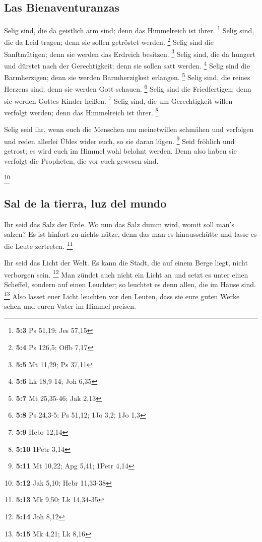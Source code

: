 \hypertarget{las-bienaventuranzas}{%
\subsection{Las Bienaventuranzas}\label{las-bienaventuranzas}}

 Selig sind, die da geistlich arm sind; denn das
Himmelreich ist ihrer. \footnote{\textbf{5:3} Ps 51,19; Jes 57,15}
 Selig sind, die da Leid tragen; denn sie sollen getröstet
werden. \footnote{\textbf{5:4} Ps 126,5; Offb 7,17}  Selig
sind die Sanftmütigen; denn sie werden das Erdreich besitzen.
\footnote{\textbf{5:5} Mt 11,29; Ps 37,11}  Selig sind,
die da hungert und dürstet nach der Gerechtigkeit; denn sie sollen satt
werden. \footnote{\textbf{5:6} Lk 18,9-14; Joh 6,35} 
Selig sind die Barmherzigen; denn sie werden Barmherzigkeit erlangen.
\footnote{\textbf{5:7} Mt 25,35-46; Jak 2,13}  Selig sind,
die reines Herzens sind; denn sie werden Gott schauen. \footnote{\textbf{5:8}
  Ps 24,3-5; Ps 51,12; 1Jo 3,2; 1Jo 1,3}  Selig sind die
Friedfertigen; denn sie werden Gottes Kinder heißen. \footnote{\textbf{5:9}
  Hebr 12,14}  Selig sind, die um Gerechtigkeit willen
verfolgt werden; denn das Himmelreich ist ihrer. \footnote{\textbf{5:10}
  1Petr 3,14}

 Selig seid ihr, wenn euch die Menschen um meinetwillen
schmähen und verfolgen und reden allerlei Übles wider euch, so sie daran
lügen. \footnote{\textbf{5:11} Mt 10,22; Apg 5,41; 1Petr 4,14}
 Seid fröhlich und getrost; es wird euch im Himmel wohl
belohnt werden. Denn also haben sie verfolgt die Propheten, die vor euch
gewesen sind.

\footnote{\textbf{5:12} Jak 5,10; Hebr 11,33-38}

\hypertarget{sal-de-la-tierra-luz-del-mundo}{%
\subsection{Sal de la tierra, luz del
mundo}\label{sal-de-la-tierra-luz-del-mundo}}

 Ihr seid das Salz der Erde. Wo nun das Salz dumm wird,
womit soll man's salzen? Es ist hinfort zu nichts nütze, denn das man es
hinausschütte und lasse es die Leute zertreten. \footnote{\textbf{5:13}
  Mk 9,50; Lk 14,34-35}

 Ihr seid das Licht der Welt. Es kann die Stadt, die auf
einem Berge liegt, nicht verborgen sein. \footnote{\textbf{5:14} Joh
  8,12}  Man zündet auch nicht ein Licht an und setzt es
unter einen Scheffel, sondern auf einen Leuchter; so leuchtet es denn
allen, die im Hause sind. \footnote{\textbf{5:15} Mk 4,21; Lk 8,16}
 Also lasset euer Licht leuchten vor den Leuten, dass sie
eure guten Werke sehen und euren Vater im Himmel preisen.

